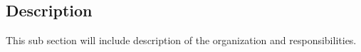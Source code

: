 \subsection{Description}
This sub section will include description of the organization and responsibilities.